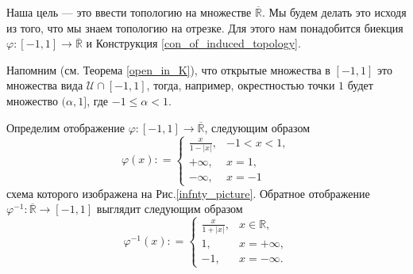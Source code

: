 Наша цель — это ввести топологию на множестве $\overline{\mathbb{R}}$. Мы будем делать это исходя из того, что мы знаем топологию на отрезке. Для этого нам понадобится биекция $\varphi: [-1,1] \to \overline{\mathbb{R}}$ и Конструкция \ref{con_of_induced_topology}.

Напомним (см. Теорема \ref{open_in_K}), что открытые множества в $[-1,1]$ это множества вида $\mathscr{U} \cap [-1,1]$, тогда, например, окрестностью точки $1$ будет множество $(\alpha, 1]$, где $-1 \le \alpha<1$.

\begin{construction}\label{construction_of_bijection}
Определим отображение $\varphi: [-1,1] \to \overline{\mathbb{R}}$, следующим образом
\[
 \varphi(x): = \begin{cases}
     \frac{x}{1-|x|}, & -1<x<1,\\
     + \infty, &x = 1, \\
     -\infty, & x=-1
 \end{cases}
\]
схема которого изображена на Рис.\ref{infnty_picture}. Обратное отображение $\varphi^{-1}: \overline{\mathbb{R}} \to [-1,1]$ выглядит следующим образом
\[
\varphi^{-1}(x): = \begin{cases}
    \frac{x}{1+ |x|}, & x \in \mathbb{R},\\
    1, & x = + \infty,\\
    -1, & x = - \infty.
\end{cases}
\]
\end{construction}

